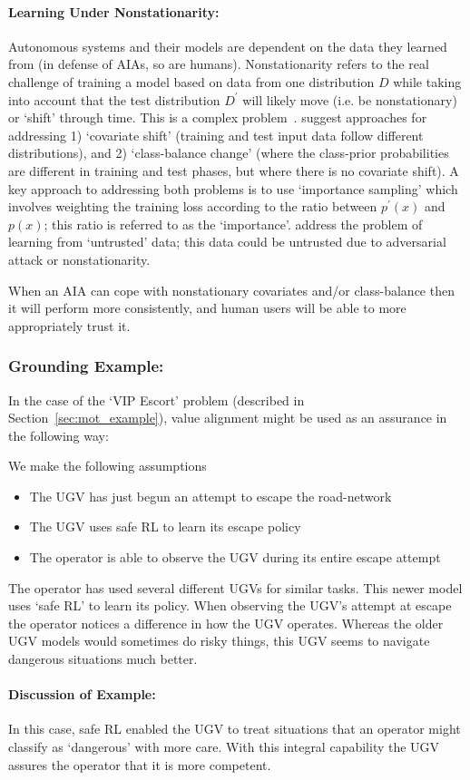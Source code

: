 \paragraph{Learning Under Nonstationarity:}
Autonomous systems and their models are dependent on the data they learned from (in defense of AIAs, so are humans). Nonstationarity refers to the real challenge of training a model based on data from one distribution $D$ while taking into account that the test distribution $D^\prime$ will likely move (i.e. be nonstationary) or `shift' through time. This is a complex problem~\cite{Quinonero-Candela2009-fj}. \citet{Sugiyama2013-ci} suggest approaches for addressing 1) `covariate shift' (training and test input data follow different distributions), and 2) `class-balance change' (where the class-prior probabilities are different in training and test phases, but where there is no covariate shift). A key approach to addressing both problems is to use `importance sampling' which involves weighting the training loss according to the ratio between $p^\prime(x)$ and $p(x)$; this ratio is referred to as the `importance'. \citet{Charikar2017-kr} address the problem of learning from `untrusted' data; this data could be untrusted due to adversarial attack or nonstationarity.

When an AIA can cope with nonstationary covariates and/or class-balance then it will perform more consistently, and human users will be able to more appropriately trust it.

\subsubsection{Grounding Example:}
In the case of the `VIP Escort' problem (described in Section~\ref{sec:mot_example}), value alignment might be used as an assurance in the following way:

We make the following assumptions

\begin{itemize}
    \item The UGV has just begun an attempt to escape the road-network
    \item The UGV uses safe RL to learn its escape policy
    \item The operator is able to observe the UGV during its entire escape attempt
\end{itemize}

The operator has used several different UGVs for similar tasks. This newer model uses `safe RL' to learn its policy. When observing the UGV's attempt at escape the operator notices a difference in how the UGV operates. Whereas the older UGV models would sometimes do risky things, this UGV seems to navigate dangerous situations much better. 

\paragraph{\textbf{Discussion of Example:}} In this case, safe RL enabled the UGV to treat situations that an operator might classify as `dangerous' with more care. With this integral capability the UGV assures the operator that it is more competent.
